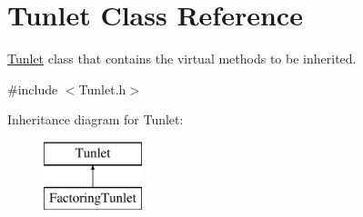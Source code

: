 \hypertarget{class_tunlet}{\section{Tunlet Class Reference}
\label{class_tunlet}
}


\hyperlink{class_tunlet}{Tunlet} class that contains the virtual methods to be inherited.  




{\ttfamily \#include $<$Tunlet.\-h$>$}

Inheritance diagram for Tunlet\-:\begin{figure}[H]
\begin{center}
\leavevmode
\includegraphics[height=2.000000cm]{class_tunlet}
\end{center}
\end{figure}
